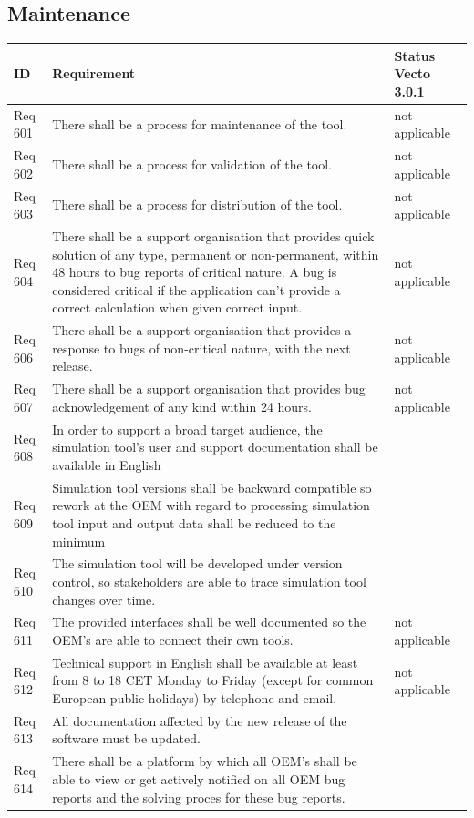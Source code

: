 \subsection{Maintenance} %
\label{sub:maintenance}

\begin{tabular}{L{\IdColWidth}|L{\ReqColWidth}|M{\StatusColWidth}}
ID & Requirement & Status Vecto 3.0.1 \\ \hline\hline
Req 601 & There shall be a process for maintenance of the tool. & 
	not applicable	 \\ \hline
Req 602 & There shall be a process for validation of the tool. & 
	not applicable	 \\ \hline
Req 603 & There shall be a process for distribution of the tool. & 
	not applicable	 \\ \hline
Req 604 & There shall be a support organisation that provides quick solution of any type, permanent or non-permanent, within 48 hours to bug reports of critical nature.  A bug is considered critical if the application can’t provide a correct calculation when given correct input. & 
	not applicable	 \\ \hline
Req 606 & There shall be a support organisation that provides a response to bugs of non-critical nature, with the next release. & 
	not applicable	 \\ \hline
Req 607 & There shall be a support organisation that provides bug acknowledgement of any kind within 24 hours. & 
	not applicable	 \\ \hline
Req 608 & In order to support a broad target audience, the simulation tool's user and support documentation shall be available in English  & 
	\Vcheck	 \\ \hline
Req 609 & Simulation tool versions shall be backward compatible so rework at the OEM with regard to processing simulation tool input and output data shall be reduced to the minimum & 
	\Vcheck	 \\ \hline
Req 610 & The simulation tool will be developed under version control, so stakeholders are able to trace simulation tool changes over time. & 
	\Vcheck	 \\ \hline
Req 611 & The provided interfaces shall be well documented so the OEM's are able to connect their own tools. & 
	not applicable	 \\ \hline
Req 612 & Technical support in English shall be available at least from 8 to 18 CET Monday to Friday (except for common European public holidays) by telephone and email. & 
	not applicable	 \\ \hline
Req 613 & All documentation affected by the new release of the software must be updated. & 
		 \\ \hline
Req 614 & There shall be a platform by which all OEM's shall be able to view or get actively notified on all OEM bug reports and the solving proces for these bug reports. & 
	\Vcheck	 \\ \hline
\end{tabular}

